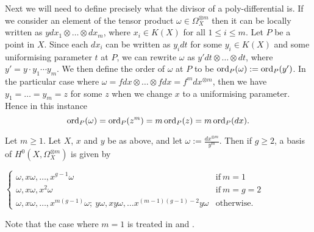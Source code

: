 Next we will need to define precisely what the divisor of a poly-differential is.
If we consider an element of the tensor product $\omega \in \Omega_X^{\otimes m}$ then it can be locally written as $y dx_1\otimes \ldots \otimes dx_m$, where $x_i \in K(X)$ for all $1 \leq i \leq m$.
Let $P$ be a point in $X$.
Since each $dx_i$ can be written as $y_i dt$ for some $y_i\in K(X)$ and some uniformising parameter $t$ at $P$, we can rewrite $\omega$ as $y' dt \otimes \ldots \otimes dt$, where $y' = y \cdot y_1 \cdots y_m$.
We then define the order of $\omega$ at $P$ to be $\operatorname{ord}_P(\omega ) := \operatorname{ord}_P(y')$.
In the particular case where $\omega = fdx \otimes \ldots \otimes fdx = f^m dx^{\otimes m}$, then we have $y_1 = \ldots = y_m = z$ for some $z$ when we change $x$ to a uniformising parameter.
Hence in this instance \[ \operatorname{ord}_P(\omega) = \operatorname{ord}_P(z^m) = m\operatorname{ord}_P(z) = m\operatorname{ord}_P(dx).\]



\begin{prop}\label{propneq2}
Let $m\geq 1$.
Let $X$, $x$ and $y$ be as above, and let $\omega := \frac{dx^{\otimes m}}{y^m}$. 
Then if $g\geq 2$, a basis of $H^0(X,\Omega_X^{\otimes m})$ is given by


$\begin{cases}
\omega, x\omega, \ldots , x^{g-1}\omega &  \mbox{if}\ m=1 \\
\omega, x\omega, x^2\omega & \mbox{if}\ m=g=2 \\
\omega, x\omega, \ldots, x^{m(g-1)}\omega;\  y\omega, xy\omega, \ldots x^{(m-1)(g-1)-2}y\omega & \mbox{otherwise.}
\end{cases}
$

\end{prop}

\begin{rem}
Note that the case where $m=1$ is treated in \cite[Prop. 7.4.26]{liu} and \cite[Ch. IV, \S 4, Prop. 4.3]{griffiths}.
\end{rem}

